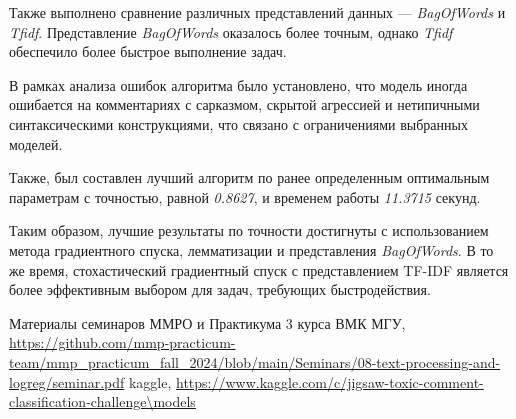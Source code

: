 \documentclass[14pt]{extarticle}
\begin{document}
Также выполнено сравнение различных представлений данных — \textit{BagOfWords} и \textit{Tfidf}. Представление \textit{BagOfWords} оказалось более точным, однако \textit{Tfidf} обеспечило более быстрое выполнение задач.

В рамках анализа ошибок алгоритма было установлено, что модель иногда ошибается на комментариях с сарказмом, скрытой агрессией и нетипичными синтаксическими конструкциями, что связано с ограничениями выбранных моделей.

Также, был составлен лучший алгоритм по ранее определенным оптимальным параметрам с точностью, равной  \textit{0.8627}, и временем работы \textit{11.3715} секунд.

Таким образом, лучшие результаты по точности достигнуты с использованием метода градиентного спуска, лемматизации и представления \textit{BagOfWords}. В то же время, стохастический градиентный спуск с представлением TF-IDF является более эффективным выбором для задач, требующих быстродействия.

\begin{thebibliography}{9}
 Материалы семинаров ММРО и Практикума 3 курса ВМК МГУ, \url{https://github.com/mmp-practicum-team/mmp_practicum_fall_2024/blob/main/Seminars/08-text-processing-and-logreg/seminar.pdf}
 kaggle, \url{https://www.kaggle.com/c/jigsaw-toxic-comment-classification-challenge\models}
\end{thebibliography}
\end{document}

